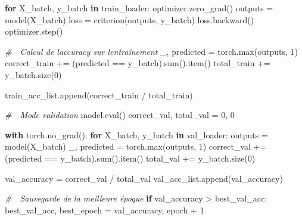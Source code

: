 \documentclass[
  letterpaper,
  DIV=11,
  numbers=noendperiod]{scrartcl}
\newenvironment{Shaded}{}{}
\newcommand{\BuiltInTok}[1]{\textcolor[rgb]{0.00,0.50,0.00}{#1}}
\newcommand{\CommentTok}[1]{\textcolor[rgb]{0.38,0.63,0.69}{\textit{#1}}}
\newcommand{\ControlFlowTok}[1]{\textcolor[rgb]{0.00,0.44,0.13}{\textbf{#1}}}
\newcommand{\DecValTok}[1]{\textcolor[rgb]{0.25,0.63,0.44}{#1}}
\newcommand{\KeywordTok}[1]{\textcolor[rgb]{0.00,0.44,0.13}{\textbf{#1}}}
\newcommand{\NormalTok}[1]{#1}
\newcommand{\OperatorTok}[1]{\textcolor[rgb]{0.40,0.40,0.40}{#1}}
\begin{document}
\begin{Shaded}
\begin{Highlighting}[]
    \ControlFlowTok{for}\NormalTok{ X\_batch, y\_batch }\KeywordTok{in}\NormalTok{ train\_loader:}
\NormalTok{        optimizer.zero\_grad()}
\NormalTok{        outputs }\OperatorTok{=}\NormalTok{ model(X\_batch)}
\NormalTok{        loss }\OperatorTok{=}\NormalTok{ criterion(outputs, y\_batch)}
\NormalTok{        loss.backward()}
\NormalTok{        optimizer.step()}

        \CommentTok{\# 🎯 Calcul de l\textquotesingle{}accuracy sur l\textquotesingle{}entraînement}
\NormalTok{        \_, predicted }\OperatorTok{=}\NormalTok{ torch.}\BuiltInTok{max}\NormalTok{(outputs, }\DecValTok{1}\NormalTok{)}
\NormalTok{        correct\_train }\OperatorTok{+=}\NormalTok{ (predicted }\OperatorTok{==}\NormalTok{ y\_batch).}\BuiltInTok{sum}\NormalTok{().item()}
\NormalTok{        total\_train }\OperatorTok{+=}\NormalTok{ y\_batch.size(}\DecValTok{0}\NormalTok{)}

\NormalTok{    train\_acc\_list.append(correct\_train }\OperatorTok{/}\NormalTok{ total\_train)}

    \CommentTok{\# 🔄 Mode validation}
\NormalTok{    model.}\BuiltInTok{eval}\NormalTok{()}
\NormalTok{    correct\_val, total\_val }\OperatorTok{=} \DecValTok{0}\NormalTok{, }\DecValTok{0}

    \ControlFlowTok{with}\NormalTok{ torch.no\_grad():}
        \ControlFlowTok{for}\NormalTok{ X\_batch, y\_batch }\KeywordTok{in}\NormalTok{ val\_loader:}
\NormalTok{            outputs }\OperatorTok{=}\NormalTok{ model(X\_batch)}
\NormalTok{            \_, predicted }\OperatorTok{=}\NormalTok{ torch.}\BuiltInTok{max}\NormalTok{(outputs, }\DecValTok{1}\NormalTok{)}
\NormalTok{            correct\_val }\OperatorTok{+=}\NormalTok{ (predicted }\OperatorTok{==}\NormalTok{ y\_batch).}\BuiltInTok{sum}\NormalTok{().item()}
\NormalTok{            total\_val }\OperatorTok{+=}\NormalTok{ y\_batch.size(}\DecValTok{0}\NormalTok{)}

\NormalTok{    val\_accuracy }\OperatorTok{=}\NormalTok{ correct\_val }\OperatorTok{/}\NormalTok{ total\_val}
\NormalTok{    val\_acc\_list.append(val\_accuracy)}

    \CommentTok{\# 🎯 Sauvegarde de la meilleure époque}
    \ControlFlowTok{if}\NormalTok{ val\_accuracy }\OperatorTok{\textgreater{}}\NormalTok{ best\_val\_acc:}
\NormalTok{        best\_val\_acc, best\_epoch }\OperatorTok{=}\NormalTok{ val\_accuracy, epoch }\OperatorTok{+} \DecValTok{1}


\end{Highlighting}
\end{Shaded}
\end{document}
